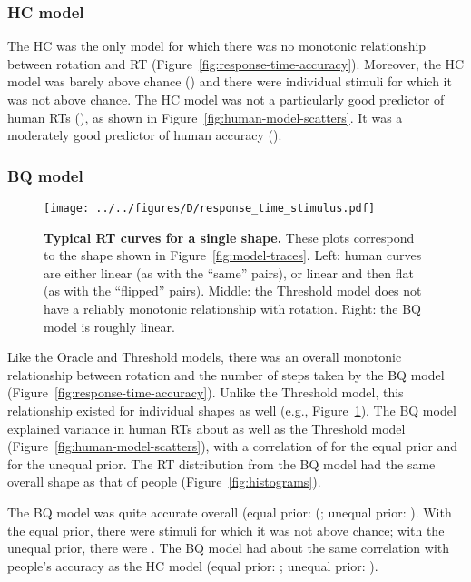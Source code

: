 \documentclass[10pt,letterpaper]{article}
\newcommand{\Oc}[0]{Oracle}
\newcommand{\Th}[0]{Threshold}
\newcommand{\Hc}[0]{HC}
\newcommand{\Bq}[0]{BQ}
\begin{document}
\subsubsection{\Hc{} model}

The \Hc{} was the only model for which there was no monotonic
relationship between rotation and RT
(Figure~\ref{fig:response-time-accuracy}). Moreover, the \Hc{} model
was barely above chance (\HcAccuracy{}) and there were \HcNumChance{}
individual stimuli for which it was not above chance. The \Hc{} model
was not a particularly good predictor of human RTs (\HcTimeCorr{}), as
shown in Figure~\ref{fig:human-model-scatters}. It was a moderately
good predictor of human accuracy (\HcAccuracyCorr{}).

\subsubsection{\Bq{} model}

\begin{figure}[t]
  \begin{center}
    \texttt{[image: ../../figures/D/response\_time\_stimulus.pdf]}
    \caption{\textbf{Typical RT curves for a single shape.}  These
      plots correspond to the shape shown in
      Figure~\ref{fig:model-traces}. Left: human curves are either
      linear (as with the ``same'' pairs), or linear and then flat (as
      with the ``flipped'' pairs). Middle: the \Th{} model does not
      have a reliably monotonic relationship with rotation. Right: the
      \Bq{} model is roughly linear.}
    \label{fig:response-time-stimulus}
  \end{center}
\end{figure}

Like the \Oc{} and \Th{} models, there was an overall monotonic
relationship between rotation and the number of steps taken by the
\Bq{} model (Figure~\ref{fig:response-time-accuracy}). Unlike the
\Th{} model, this relationship existed for individual shapes as well
(e.g., Figure~\ref{fig:response-time-stimulus}).  The \Bq{} model
explained variance in human RTs about as well as the \Th{} model
(Figure~\ref{fig:human-model-scatters}), with a correlation of
\BqTimeCorr{} for the equal prior and \BqpTimeCorr{} for the unequal
prior. The RT distribution from the \Bq{} model had the same overall
shape as that of people (Figure~\ref{fig:histograms}).

The \Bq{} model was quite accurate overall (equal prior:
(\BqAccuracy{}; unequal prior: \BqpAccuracy{}). With the equal prior,
there were \BqNumChance{} stimuli for which it was not above chance;
with the unequal prior, there were \BqpNumChance{}. The \Bq{} model
had about the same correlation with people's accuracy as the \Hc{}
model (equal prior: \BqAccuracyCorr{}; unequal prior:
\BqpAccuracyCorr{}).
\end{document}
